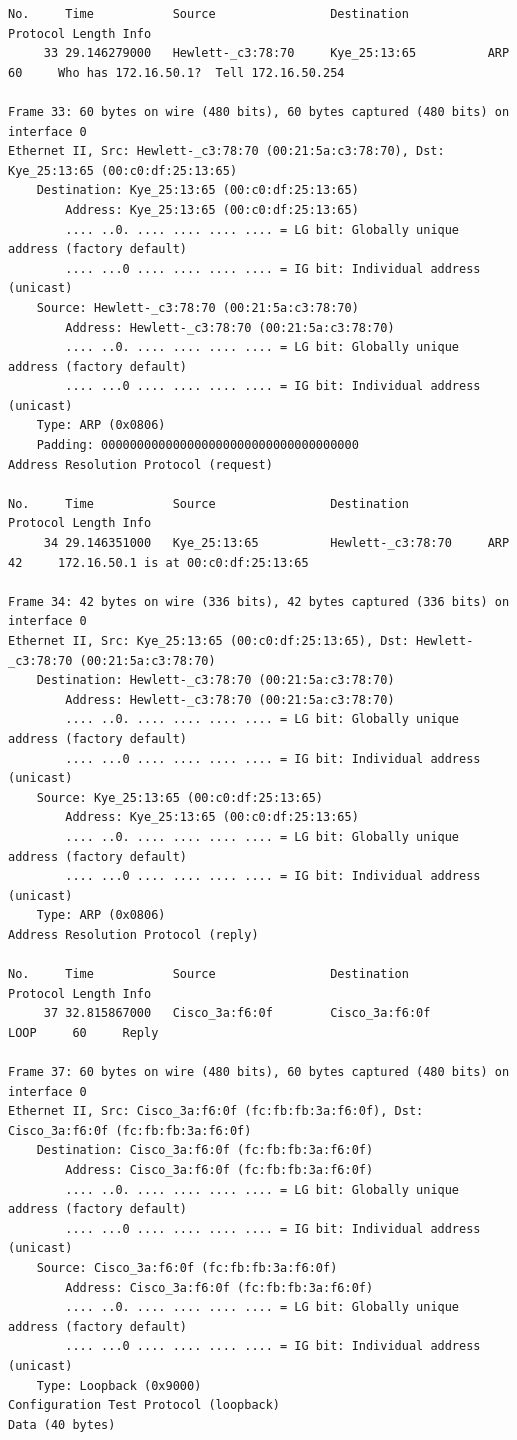 \documentclass[a4paper,11pt]{article}
\begin{document}
\begin{lstlisting}
No.     Time           Source                Destination           Protocol Length Info
     33 29.146279000   Hewlett-_c3:78:70     Kye_25:13:65          ARP      60     Who has 172.16.50.1?  Tell 172.16.50.254

Frame 33: 60 bytes on wire (480 bits), 60 bytes captured (480 bits) on interface 0
Ethernet II, Src: Hewlett-_c3:78:70 (00:21:5a:c3:78:70), Dst: Kye_25:13:65 (00:c0:df:25:13:65)
    Destination: Kye_25:13:65 (00:c0:df:25:13:65)
        Address: Kye_25:13:65 (00:c0:df:25:13:65)
        .... ..0. .... .... .... .... = LG bit: Globally unique address (factory default)
        .... ...0 .... .... .... .... = IG bit: Individual address (unicast)
    Source: Hewlett-_c3:78:70 (00:21:5a:c3:78:70)
        Address: Hewlett-_c3:78:70 (00:21:5a:c3:78:70)
        .... ..0. .... .... .... .... = LG bit: Globally unique address (factory default)
        .... ...0 .... .... .... .... = IG bit: Individual address (unicast)
    Type: ARP (0x0806)
    Padding: 000000000000000000000000000000000000
Address Resolution Protocol (request)

No.     Time           Source                Destination           Protocol Length Info
     34 29.146351000   Kye_25:13:65          Hewlett-_c3:78:70     ARP      42     172.16.50.1 is at 00:c0:df:25:13:65

Frame 34: 42 bytes on wire (336 bits), 42 bytes captured (336 bits) on interface 0
Ethernet II, Src: Kye_25:13:65 (00:c0:df:25:13:65), Dst: Hewlett-_c3:78:70 (00:21:5a:c3:78:70)
    Destination: Hewlett-_c3:78:70 (00:21:5a:c3:78:70)
        Address: Hewlett-_c3:78:70 (00:21:5a:c3:78:70)
        .... ..0. .... .... .... .... = LG bit: Globally unique address (factory default)
        .... ...0 .... .... .... .... = IG bit: Individual address (unicast)
    Source: Kye_25:13:65 (00:c0:df:25:13:65)
        Address: Kye_25:13:65 (00:c0:df:25:13:65)
        .... ..0. .... .... .... .... = LG bit: Globally unique address (factory default)
        .... ...0 .... .... .... .... = IG bit: Individual address (unicast)
    Type: ARP (0x0806)
Address Resolution Protocol (reply)

No.     Time           Source                Destination           Protocol Length Info
     37 32.815867000   Cisco_3a:f6:0f        Cisco_3a:f6:0f        LOOP     60     Reply

Frame 37: 60 bytes on wire (480 bits), 60 bytes captured (480 bits) on interface 0
Ethernet II, Src: Cisco_3a:f6:0f (fc:fb:fb:3a:f6:0f), Dst: Cisco_3a:f6:0f (fc:fb:fb:3a:f6:0f)
    Destination: Cisco_3a:f6:0f (fc:fb:fb:3a:f6:0f)
        Address: Cisco_3a:f6:0f (fc:fb:fb:3a:f6:0f)
        .... ..0. .... .... .... .... = LG bit: Globally unique address (factory default)
        .... ...0 .... .... .... .... = IG bit: Individual address (unicast)
    Source: Cisco_3a:f6:0f (fc:fb:fb:3a:f6:0f)
        Address: Cisco_3a:f6:0f (fc:fb:fb:3a:f6:0f)
        .... ..0. .... .... .... .... = LG bit: Globally unique address (factory default)
        .... ...0 .... .... .... .... = IG bit: Individual address (unicast)
    Type: Loopback (0x9000)
Configuration Test Protocol (loopback)
Data (40 bytes)


\end{lstlisting}
\end{document}
